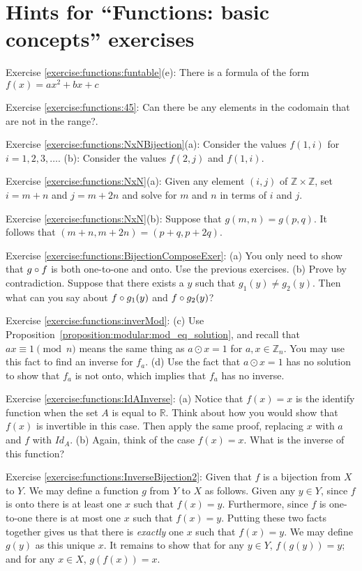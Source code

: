 \section{Hints for ``Functions: basic concepts'' exercises}\label{sec:functions:hints}

\noindent Exercise \ref{exercise:functions:funtable}(e): There is a formula of the form $f(x) = ax^2 + bx + c$

\noindent Exercise \ref{exercise:functions:45}: Can there be any elements in the codomain that are not in the range?.

\noindent Exercise \ref{exercise:functions:NxNBijection}(a): Consider the values $f(1,i)$  for $i=1,2,3,\ldots$. (b): Consider  the values $f(2,j)$ and $f(1,i)$.

\noindent Exercise \ref{exercise:functions:NxN}(a): Given any element $(i,j)$ of $\mathbb{Z} \times \mathbb{Z}$, set $i=m+n$ and $j=m+2n$ and solve for $m$ and $n$ in terms of $i$ and $j$.

\noindent Exercise \ref{exercise:functions:NxN}(b): Suppose that $g(m,n) = g(p,q)$. It follows that $(m + n, m + 2n) = (p + q, p + 2q)$. %

\noindent Exercise \ref{exercise:functions:BijectionComposeExer}: (a) You only need to show that $g \circ f$ is both one-to-one and onto. Use the previous exercises.  (b)  Prove by contradiction. Suppose that there exists a $y$ such that $g_1(y) \neq g_2(y)$.  Then what can you say about $f \circ g_1(y)$ and  $f \circ  g_2(y)$?

\noindent Exercise \ref{exercise:functions:inverMod}: (c) 
Use Proposition~\ref{proposition:modular:mod_eq_solution}, and recall that $ax \equiv 1 \pmod{n}$ means the same thing as $a \odot x = 1$ for $a,x \in \mathbb{Z}_n$.  You may use this fact to find an inverse for $f_a$. (d) Use the fact that $a \odot x = 1$ has no solution to  show that $f_a$ is not onto, which implies that $f_a$ has no inverse.

\noindent Exercise \ref{exercise:functions:IdAInverse}: (a) Notice that $f(x)=x$ is the identify function when the set $A$ is equal to $\mathbb{R}$.  Think about how you would show that $f(x)$ is invertible in this case.  Then apply the same proof, replacing $x$ with $a$ and $f$ with
$Id_A$.  (b) Again, think of the case $f(x)=x$.  What is the inverse of this function? 

\noindent Exercise \ref{exercise:functions:InverseBijection2}: Given that $f$ is a bijection from $X$ to $Y$. We may define a function $g$ from $Y$ to $X$ as follows.  Given any $y \in Y$, since $f$ is onto there is at least one $x$ such that $f(x) = y$. Furthermore, since $f$ is one-to-one there is at most one $x$ such that $f(x)=y$. Putting these two facts together gives us that there is \emph{exactly} one $x$ such that $f(x)=y$.  We may define $g(y)$ as this unique $x$. It remains to show that for any $y \in Y$, $f(g(y))=y$; and for any $x \in X$, $g(f(x))=x$.

